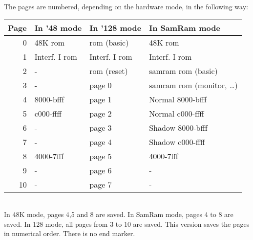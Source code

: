 \noindent
    The pages are numbered, depending on the hardware mode, in the following
    way: \\

\begin{tabular}{|r|l|l|l|}
	\hline
        Page  &  In '48 mode   &  In '128 mode  &  In SamRam mode 	\\
        \hline
	\hline
         0    &  48K rom       &  rom (basic)   &  48K rom		\\
         1    &  Interf. I rom &  Interf. I rom &  Interf. I rom	\\
         2    &  -             &  rom (reset)   &  samram rom (basic)	\\
         3    &  -             &  page 0        &  samram rom (monitor, \ldots)\\
         4    &  8000-bfff     &  page 1        &  Normal 8000-bfff	\\
         5    &  c000-ffff     &  page 2        &  Normal c000-ffff	\\
         6    &  -             &  page 3        &  Shadow 8000-bfff	\\
         7    &  -             &  page 4        &  Shadow c000-ffff	\\
         8    &  4000-7fff     &  page 5        &  4000-7fff		\\
         9    &  -             &  page 6        &  -			\\
        10    &  -             &  page 7        &  -			\\
	\hline
\end{tabular}\\

\noindent
    In 48K mode, pages 4,5 and 8 are saved.  In SamRam mode, pages 4 to 8
    are saved.  In 128 mode, all pages from 3 to 10 are saved.  This
    version saves the pages in numerical order.  There is no end marker.




